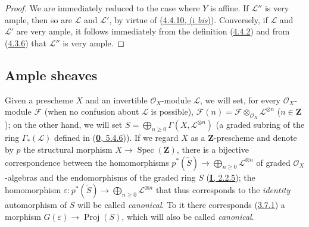 \begin{proof}
We are immediately reduced to the case where $Y$ is affine. If $\mathcal{L}''$
is very ample, then so are $\mathcal{L}$ and $\mathcal{L}'$, by virtue of
(\hyperref[II.4.4.10]{4.4.10, (i \emph{bis})}). Conversely, if $\mathcal{L}$ and
$\mathcal{L}'$ are very ample, it follows immediately from the definition
(\hyperref[II.4.4.2]{4.4.2}) and from
(\hyperref[II.4.3.6]{4.3.6}) that $\mathcal{L}''$ is very ample.
\end{proof}


\subsection{Ample sheaves}
\label{subsection:II.4.5}

\begin{env}[4.5.1]
\label{II.4.5.1}
Given a prescheme $X$ and an invertible $\mathcal{O}_X$-module
$\mathcal{L}$, we will set, for every $\mathcal{O}_X$-module $\mathcal{F}$
(when no confusion about $\mathcal{L}$ is possible),
$\mathcal{F}(n)=\mathcal{F}\otimes_{\mathcal{O}_X}\mathcal{L}^{\otimes n}$
($n\in\mathbf{Z}$); on the other hand, we will set $S=\bigoplus_{n\geq0}\Gamma(X,\mathcal{L}^{\otimes n})$
(a graded subring of the ring $\Gamma_*(\mathcal{L})$ defined in
(\hyperref[0.5.4.6]{\textbf{0}, 5.4.6})). If we regard $X$ as a
$\mathbf{Z}$-prescheme and denote by $p$ the structural morphism
$X\to\operatorname{Spec}(\mathbf{Z})$, there is a bijective correspondence
between the homomorphisms $p^*(\widetilde{S})\longrightarrow
\bigoplus_{n\geq0}\mathcal{L}^{\otimes n}$
of graded $\mathcal{O}_X$-algebras and the endomorphisms of the graded ring
$S$ (\hyperref[I.2.2.5]{\textbf{I}, 2.2.5}); the homomorphism $\varepsilon:p^*(\widetilde{S})\longrightarrow\bigoplus_{n\geq0}\mathcal{L}^{\otimes n}$
that thus corresponds to the \emph{identity} automorphism of $S$ will be called
\emph{canonical}. To it there corresponds (\hyperref[II.3.7.1]{3.7.1}) a morphism
$G(\varepsilon)\to\operatorname{Proj}(S)$, which will also be called \emph{canonical}.
\end{env}

